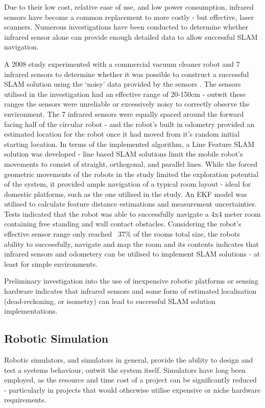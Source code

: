 Due to their low cost, relative ease of use, and low power consumption,
infrared sensors have become a common replacement to more costly - but
effective, laser scanners.
Numerous investigations have been conducted to determine whether infrared
sensor alone can provide enough detailed data to allow successful SLAM
navigation.

A 2008 study experimented with a commercial vacuum cleaner robot and 7 infrared
sensors to determine whether it was possible to construct a successful SLAM
solution using the `noisy' data provided by the sensors \cite{Choi2008}.
The sensors utilised in the investigation had an effective range of 20-150cm -
outwit these ranges the sensors were unreliable or excessively noisy to
correctly observe the environment.
The 7 infrared sensors were equally spaced around the forward facing half of
the circular robot - and the robot's built in odometry provided an estimated
location for the robot once it had moved from it's random initial starting
location.
In terms of the implemented algorithm, a  Line Feature SLAM solution was
developed - line based SLAM solutions limit the mobile robot's movements to
consist of straight, orthogonal, and parallel lines.
While the forced geometric movements of the robots in the study limited the
exploration potential of the system, it provided ample navigation of a typical
room layout - ideal for domestic platforms, such as the one utilised in the
study.
An EKF model was utilised to calculate feature distance estimations and
measurement uncertainties.
Tests indicated that the  robot was able to successfully navigate a 4x4 meter
room containing free standing and wall contact obstacles.
Considering the robot's effective sensor range only reached ~37\% of the rooms
total size, the robots ability to successfully, navigate and map the room and
its contents indicates that infrared sensors and odometery can be utilised to
implement SLAM solutions - at least for simple environments.

Preliminary investigation into the use of inexpensive robotic platforms or
sensing hardware indicates that infrared sensors and some form of estimated
localisation (dead-reckoning, or isometry) can lead to successful SLAM solution
implementations.


\subsection{Robotic Simulation} \label{sec_sim}
Robotic simulators, and simulators in general, provide the ability to design
and test a  systems behaviour, outwit the system itself. 
Simulators have long been employed, as the resource and time cost of a project
can be significantly reduced - particularly in projects that would otherwise
utilise expensive or niche hardware requirements.

